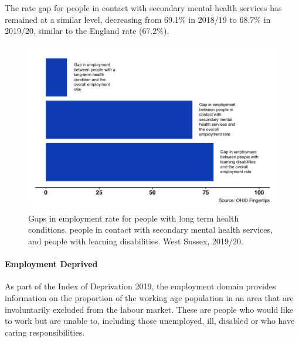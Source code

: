 The rate gap for people in contact with secondary mental health services has remained at a similar level, decreasing from 69.1\% in 2018/19 to 68.7\% in 2019/20, similar to the England rate (67.2\%).

\begin{figure}[htp]
    \caption[Gaps in employment rate, West Sussex 2019/20.]{Gaps in employment rate for people with long term health conditions, people in contact with secondary mental health services, and people with learning disabilities. West Sussex, 2019/20.}\label{fig:emp_gaps}
    \centering
	\includegraphics[width=.9\linewidth]{images/employment_gaps.png}
\end{figure}


\paragraph{Employment Deprived} As part of the Index of Deprivation 2019, the employment domain provides information on the proportion of the working age population in an area that are involuntarily excluded from the labour market. These are people who would like to work but are unable to, including those unemployed, ill, disabled or who have caring responsibilities.

